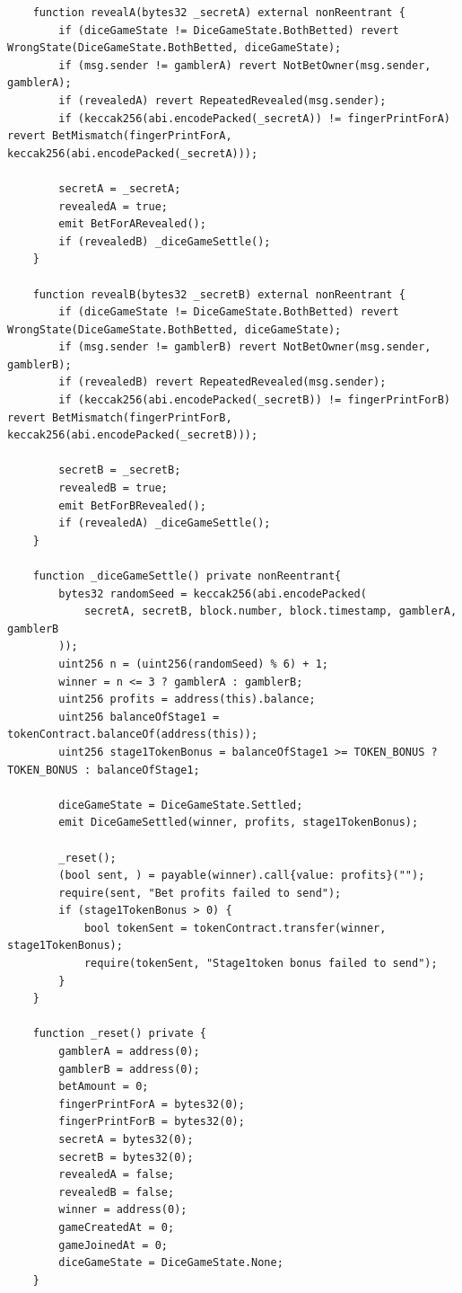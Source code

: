 \documentclass[10pt,a4paper]{article}
\begin{document}
\begin{lstlisting}
    function revealA(bytes32 _secretA) external nonReentrant {
        if (diceGameState != DiceGameState.BothBetted) revert WrongState(DiceGameState.BothBetted, diceGameState);
        if (msg.sender != gamblerA) revert NotBetOwner(msg.sender, gamblerA);
        if (revealedA) revert RepeatedRevealed(msg.sender);
        if (keccak256(abi.encodePacked(_secretA)) != fingerPrintForA) revert BetMismatch(fingerPrintForA, keccak256(abi.encodePacked(_secretA)));
     
        secretA = _secretA;
        revealedA = true;
        emit BetForARevealed();
        if (revealedB) _diceGameSettle(); 
    }

    function revealB(bytes32 _secretB) external nonReentrant {
        if (diceGameState != DiceGameState.BothBetted) revert WrongState(DiceGameState.BothBetted, diceGameState);
        if (msg.sender != gamblerB) revert NotBetOwner(msg.sender, gamblerB);
        if (revealedB) revert RepeatedRevealed(msg.sender);
        if (keccak256(abi.encodePacked(_secretB)) != fingerPrintForB) revert BetMismatch(fingerPrintForB, keccak256(abi.encodePacked(_secretB)));
     
        secretB = _secretB;
        revealedB = true;
        emit BetForBRevealed();
        if (revealedA) _diceGameSettle(); 
    }

    function _diceGameSettle() private nonReentrant{
        bytes32 randomSeed = keccak256(abi.encodePacked(
            secretA, secretB, block.number, block.timestamp, gamblerA, gamblerB
        ));
        uint256 n = (uint256(randomSeed) % 6) + 1;
        winner = n <= 3 ? gamblerA : gamblerB;
        uint256 profits = address(this).balance;
        uint256 balanceOfStage1 = tokenContract.balanceOf(address(this));
        uint256 stage1TokenBonus = balanceOfStage1 >= TOKEN_BONUS ? TOKEN_BONUS : balanceOfStage1;

        diceGameState = DiceGameState.Settled;
        emit DiceGameSettled(winner, profits, stage1TokenBonus);

        _reset();
        (bool sent, ) = payable(winner).call{value: profits}("");
        require(sent, "Bet profits failed to send");
        if (stage1TokenBonus > 0) {
            bool tokenSent = tokenContract.transfer(winner, stage1TokenBonus);
            require(tokenSent, "Stage1token bonus failed to send");
        }
    }

    function _reset() private {
        gamblerA = address(0);
        gamblerB = address(0);
        betAmount = 0;
        fingerPrintForA = bytes32(0);
        fingerPrintForB = bytes32(0);
        secretA = bytes32(0);
        secretB = bytes32(0);
        revealedA = false;
        revealedB = false;
        winner = address(0);
        gameCreatedAt = 0;
        gameJoinedAt = 0;
        diceGameState = DiceGameState.None;
    }


\end{lstlisting}
\end{document}
